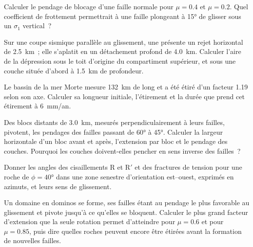 \begin{exercise}[$\star\star$]\label{exo:b3:extension-strike-slip:7}
Calculer le pendage de blocage d'une faille normale pour $\mu = 0.4$ et $\mu = 0.2$.
Quel coefficient de frottement permettrait à une faille plongeant à \ang{15} de glisser sous un
$\sigma_1$ vertical~?
\end{exercise}

\begin{exercise}[$\star\star$]\label{exo:b3:extension-strike-slip:8}
Sur une coupe sismique parallèle au glissement, une  présente un rejet horizontal de
\qty{2.5}{km}~; elle s'aplatit en un détachement profond de \qty{4.0}{km}. Calculer
l'aire de la dépression sous le toit d'origine du compartiment supérieur, et sous une couche
située d'abord à \qty{1.5}{km} de profondeur.
\end{exercise}

\begin{exercise}[$\star\star$]\label{exo:b3:extension-strike-slip:9}
Le bassin de la mer Morte mesure \qty{132}{km} de long et a été étiré d'un facteur 1.19
selon son axe. Calculer sa longueur initiale, l'étirement et la durée
que prend cet étirement à \qty{6}{mm/an}.
\end{exercise}

\begin{exercise}[$\star\star\star$]\label{exo:b3:extension-strike-slip:10}
Des blocs distants de \qty{3.0}{km}, mesurés perpendiculairement à leurs failles, pivotent,
les pendages des failles passant de \ang{60} à \ang{45}. Calculer la largeur horizontale
d'un bloc avant et après, l'extension par bloc et le pendage des couches.
Pourquoi les couches doivent-elles pencher en sens inverse des failles~?
\end{exercise}

\begin{exercise}[$\star\star\star$]\label{exo:b3:extension-strike-slip:11}
Donner les angles des cisaillements R et R$'$ et des fractures de tension pour une
roche de $\phi = \ang{40}$ dans une zone senestre d'orientation est--ouest, exprimés
en azimuts, et leurs sens de glissement.
\end{exercise}

\begin{exercise}[$\star\star\star$]\label{exo:b3:extension-strike-slip:12}
Un domaine en dominos se forme, ses failles étant au pendage le plus favorable au glissement et
pivote jusqu'à ce qu'elles se bloquent. Calculer le plus grand facteur d'extension que la
seule rotation permet d'atteindre pour $\mu = 0.6$ et pour $\mu = 0.85$, puis dire quelles
roches peuvent encore être étirées avant la formation de nouvelles failles.
\end{exercise}

